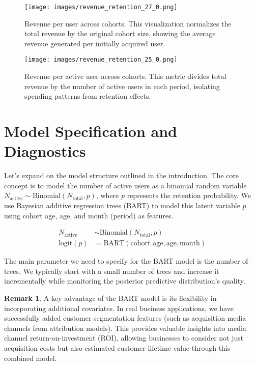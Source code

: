 \documentclass[11pt]{amsart}
\theoremstyle{definition}
\newtheorem{remark}{Remark}
\begin{document}
\begin{figure}
    \centering
    \texttt{[image: images/revenue\_retention\_27\_0.png]}
    \caption{Revenue per user across cohorts. This visualization normalizes the total revenue by the original cohort size,
        showing the average revenue generated per initially acquired user.}
    \label{fig:revenue_per_user}
\end{figure}

\begin{figure}
    \centering
    \texttt{[image: images/revenue\_retention\_25\_0.png]}
    \caption{Revenue per active user across cohorts. This metric divides total revenue by the number of active users in each
        period, isolating spending patterns from retention effects.}
    \label{fig:revenue_per_active_user}
\end{figure}

\section{Model Specification and Diagnostics}

Let's expand on the model structure outlined in the introduction. The core concept is to model the number of active users
as a binomial random variable $N_{\text{active}} \sim \text{Binomial}(N_{\text{total}}, p)$, where $p$ represents the retention
probability. We use Bayesian additive regression trees (BART) to model this latent variable $p$ using cohort age, age, and
month (period) as features.

\begin{align*}
    N_{\text{active}} & \sim \text{Binomial}(N_{\text{total}}, p)                  \\
    \textrm{logit}(p) & = \text{BART}(\text{cohort age}, \text{age}, \text{month})
\end{align*}

The main parameter we need to specify for the BART model is the number of trees. We typically start with a small number of
trees and increase it incrementally while monitoring the posterior predictive distribution's quality.

\begin{remark}
    A key advantage of the BART model is its flexibility in incorporating additional covariates. In real business
    applications, we have successfully added customer segmentation features (such as acquisition media channels from
    attribution models). This provides valuable insights into media channel return-on-investment (ROI), allowing businesses
    to consider not just acquisition costs but also estimated customer lifetime value through this combined model.
\end{remark}
\end{document}
